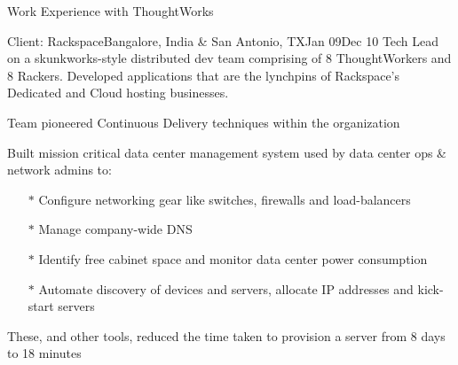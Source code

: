 \documentclass{resume} %
\begin{document}
\begin{rSection}{Work Experience with ThoughtWorks}

\begin{rSubsection}{Client: Rackspace}{Bangalore, India \& San Antonio,
  TX}{Jan 09}{Dec
    10}
{Tech Lead on a skunkworks-style distributed dev team comprising of 8
  ThoughtWorkers and 8 Rackers. Developed applications that are the
  lynchpins of Rackspace's Dedicated and Cloud hosting businesses.}

\item Team pioneered Continuous Delivery techniques within the organization
\item Built mission critical data center management system used by
  data center ops \& network admins to:
\vspace{-0.5em}
\begin{itemize}  \itemsep0.5pt \parskip0pt
    \item[$\ast$] Configure networking gear like switches, firewalls and load-balancers
    \item[$\ast$] Manage company-wide DNS
    \item[$\ast$] Identify free cabinet space and monitor data center power consumption
    \item[$\ast$] Automate discovery of devices and servers, allocate IP addresses and kick-start servers
\end{itemize}
\item These, and other tools, reduced the time taken to provision a server from 8 days to 18 minutes
\end{rSubsection}

\end{rSection}

\end{document}

